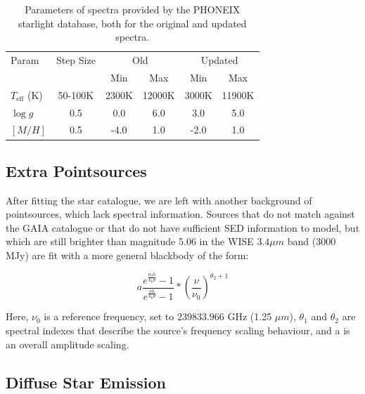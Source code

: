 \documentclass{aa}
\begin{document}
\begin{table}
    \centering
    \begin{tabular}{l c c c c c }
    \hline
    \hline
     Param & Step Size & \multicolumn{2}{c}{Old} & \multicolumn{2}{c}{Updated}\\ 
     & & Min & Max & Min & Max\\
    \hline
    \hline
    $T_{\mathrm{eff}}$ (K) & 50-100K & 2300K & 12000K & 3000K & 11900K\\
    $\log g$ & 0.5 & 0.0 & 6.0 & 3.0 & 5.0 \\
    $[M/H]$ & 0.5 & -4.0 & 1.0 & -2.0 & 1.0 \\
     \hline
    \end{tabular}
    \caption{Parameters of spectra provided by the PHONEIX starlight database, both for the original and updated spectra.}
    \label{tab:phoenix}
\end{table}

\subsection{Extra Pointsources}

\label{sec:extragalacticmodel}

After fitting the star catalogue, we are left with another background of pointsources, which lack spectral information. Sources that do not match against the GAIA catalogue or that do not have sufficient SED information to model, but which are still brighter than magnitude 5.06 in the WISE $3.4 \mu m$ band ($3000$ MJy) are fit with a more general blackbody of the form:

\begin{equation}
a \frac{e^{\frac{\nu_0 h}{k_b \theta}} - 1}{e^{\frac{\nu h}{k_b \theta}} - 1} * (\frac{\nu}{\nu_0})^{\theta_2 + 1}
\end{equation}

Here, $\nu_0$ is a reference frequency, set to $239833.966$ GHz (1.25 $\mu m$), $\theta_1$ and $\theta_2$ are spectral indexes that describe the source's frequency scaling behaviour, and a is an overall amplitude scaling. 



\subsection{Diffuse Star Emission}

\label{sec:diffusemodel}
\end{document}
